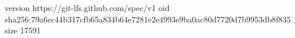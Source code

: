 version https://git-lfs.github.com/spec/v1
oid sha256:79a6ec44b317cfb65a834b64e7281e2e4993e9ba0ac80d7720d7b9953db8f835
size 17591
